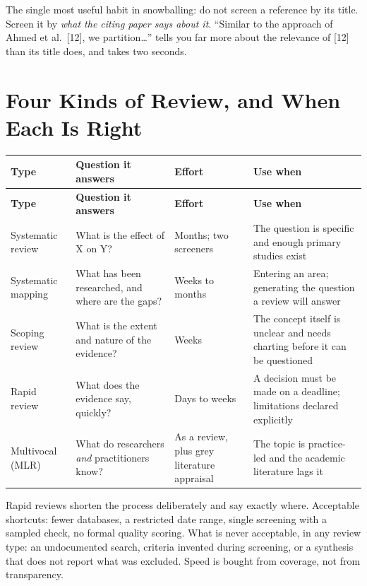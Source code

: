\begin{conceptbox}
The single most useful habit in snowballing: do not screen a reference by its
title. Screen it by \emph{what the citing paper says about it}. ``Similar to
the approach of Ahmed et al.\ [12], we partition\ldots'' tells you far more
about the relevance of [12] than its title does, and takes two seconds.
\end{conceptbox}

\section{Four Kinds of Review, and When Each Is Right}

\begin{center}
\small
\begin{longtable}{@{}L{2.5cm}L{4.3cm}L{3.4cm}L{4.0cm}@{}}
\toprule
\textbf{Type} & \textbf{Question it answers} & \textbf{Effort} & \textbf{Use when} \\
\midrule
\endfirsthead
\toprule
\textbf{Type} & \textbf{Question it answers} & \textbf{Effort} & \textbf{Use when} \\
\midrule
\endhead
\bottomrule
\endfoot
Systematic review
  & What is the effect of X on Y?
  & Months; two screeners
  & The question is specific and enough primary studies exist \\
Systematic mapping
  & What has been researched, and where are the gaps?
  & Weeks to months
  & Entering an area; generating the question a review will
    answer~\cite{petersen2015guidelines} \\
Scoping review
  & What is the extent and nature of the evidence?
  & Weeks
  & The concept itself is unclear and needs charting before it can be
    questioned \\
Rapid review
  & What does the evidence say, quickly?
  & Days to weeks
  & A decision must be made on a deadline; limitations declared explicitly \\
Multivocal (MLR)
  & What do researchers \emph{and} practitioners know?
  & As a review, plus grey literature appraisal
  & The topic is practice-led and the academic literature lags it \\
\end{longtable}
\end{center}

\begin{alertbox}
Rapid reviews shorten the process deliberately and say exactly where. Acceptable
shortcuts: fewer databases, a restricted date range, single screening with a
sampled check, no formal quality scoring. What is never acceptable, in any
review type: an undocumented search, criteria invented during screening, or a
synthesis that does not report what was excluded. Speed is bought from
coverage, not from transparency.
\end{alertbox}

